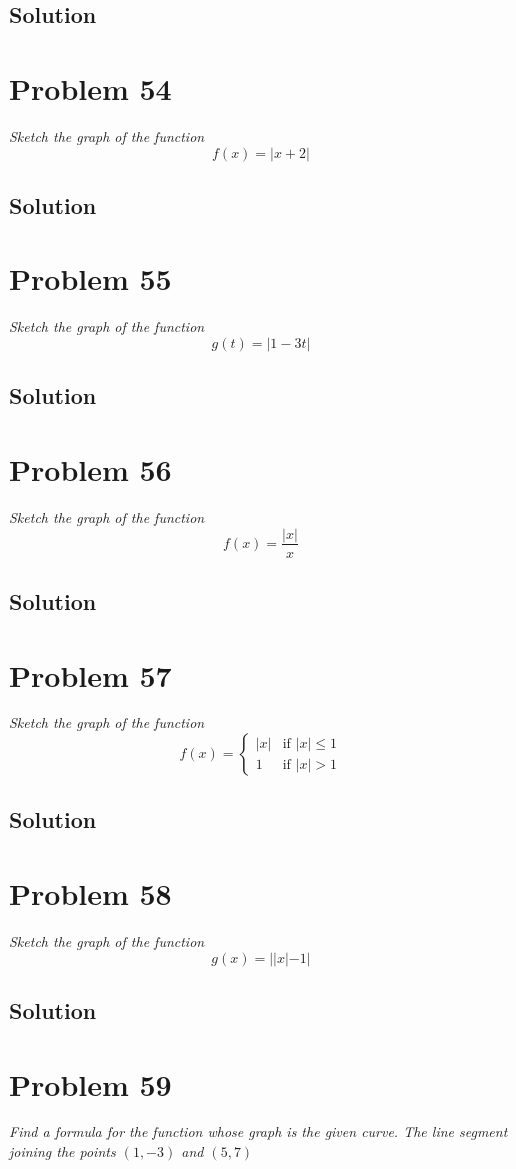 \documentclass[11pt]{article}
\newcommand{\soln}{\subsection*}
\newcommand{\qn}{\textit}
\begin{document}
\soln{Solution}

\section*{Problem 54}

\qn{Sketch the graph of the function $$f(x)=|x+2|$$}

\soln{Solution}

\section*{Problem 55}

\qn{Sketch the graph of the function $$g(t)=|1-3t|$$}

\soln{Solution}

\section*{Problem 56}

\qn{Sketch the graph of the function $$f(x)=\frac{|x|}{x}$$}

\soln{Solution}

\section*{Problem 57}

\qn{Sketch the graph of the function}
\begin{equation}
	f(x)=
	\begin{cases}
		|x| & \text{if } |x| \le 1\\
		1 & \text{if } |x| > 1
	\end{cases}
\end{equation}

\soln{Solution}

\section*{Problem 58}

\qn{Sketch the graph of the function $$g(x)=||x|-1|$$}

\soln{Solution}

\section*{Problem 59}

\qn{Find a formula for the function whose graph is the given curve. The line segment joining the points $(1, -3)$ and $(5,7)$}
\end{document}
